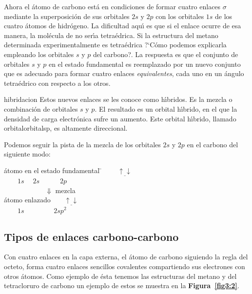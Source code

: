Ahora el \'atomo de carbono est\'a en condiciones de formar cuatro enlaces $\sigma$ mediante la superposici\'on de sus orbitales $2s$ y $2p$ con los
orbitales $1s$ de los cuatro \'atomos de hidr\'ogeno. La dificultad aqu\'{\i} es que si el enlace ocurre de esa manera, la mol\'ecula de  no ser\'{\i}a
tetra\'edrica. Si la estructura del metano determinada experimentalmente es tetra\'edrica ?`C\'omo podemos explicarla empleando los orbitales $s$ y $p$ del
carbono?. La respuesta es que el conjunto de orbitales $s$ y $p$ en el estado fundamental es reemplazado por un nuevo conjunto que es adecuado para formar
cuatro enlaces \textit{equivalentes}, cada uno en un \'angulo tetra\'edrico con respecto a los otros.

\gls{hibridacion}
Estos nuevos enlaces se les conoce como h\'{\i}bridos. Es la mezcla  o combinaci\'on de orbitales $s$ y $p$. El resultado es un orbital h\'{\i}brido, en el que la densidad de carga electr\'onica sufre un aumento. Este orbital h\'{\i}brido, llamado orbital\gls{orbitalsp}, es altamente direccional.

Podemos seguir la pista de la mezcla de los orbitales $2s$  y $2p$ en el carbono del siguiente modo:

\begin{tabbing}
\'atomo en el estado fundamental \= $\qquad\underline{\uparrow \downarrow}\quad 
$\fbox{$\underline{\uparrow\downarrow}\quad
\underbrace{\underline{\uparrow\:\;}
\quad \underline{\uparrow\:\; }\quad \underline{\;\:\;}}$} \\
\>$\qquad 1s \quad\; 2s\quad \quad\quad 2p$\\
\>$\qquad \qquad \qquad \Downarrow$ {\footnotesize mezcla}\\
\'atomo enlazado\>$\qquad\underline{\uparrow \downarrow}\quad 
$\fbox{$\underline{\uparrow \:\;}\quad
\underline{\uparrow \:\;}
\quad \underline{\uparrow\:\; }\quad \underline{\uparrow\:\;} $}\\
\>$\qquad 1s$  $\qquad \quad\quad 2sp^2$\\
\end{tabbing}
     
\subsection{Tipos de enlaces car\-bo\-no-car\-bono}
Con cuatro enlaces en la capa externa, el \'atomo de carbono siguiendo la regla del
octeto, forma cuatro enlaces sencillos covalentes compartiendo sus electrones con otros
\'atomos. Como ejemplo de \'esta tenemos las estruc\-turas del metano y del tetracloruro
de carbono un ejemplo de estos se muestra en la \textbf{Figura~\ref{fig3:2}}.

